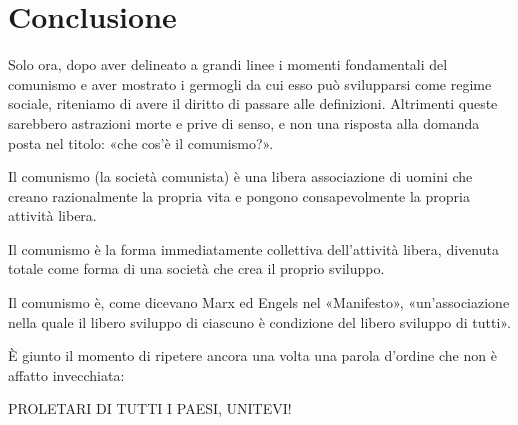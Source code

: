 \documentclass[../main]{subfiles}
\begin{document}
\ifSubfilesClassLoaded{\setcounter{page}{62}}{}
\section{Conclusione}
\label{sec:11_conclusione}

Solo ora, dopo aver delineato a grandi linee i momenti fondamentali del comunismo e aver mostrato i germogli da cui esso può svilupparsi come regime sociale, riteniamo di avere il diritto di passare alle definizioni. Altrimenti queste sarebbero astrazioni morte e prive di senso, e non una risposta alla domanda posta nel titolo: «che cos'è il comunismo?».

Il comunismo (la società comunista) è una libera associazione di uomini che creano razionalmente la propria vita e pongono consapevolmente la propria attività libera.

Il comunismo è la forma immediatamente collettiva dell'attività libera, divenuta totale come forma di una società che crea il proprio sviluppo.

Il comunismo è, come dicevano Marx ed Engels nel «Manifesto», «un'associazione nella quale il libero sviluppo di ciascuno è condizione del libero sviluppo di tutti».

È giunto il momento di ripetere ancora una volta una parola d'ordine che non è affatto invecchiata:

PROLETARI DI TUTTI I PAESI, UNITEVI!
\end{document}

